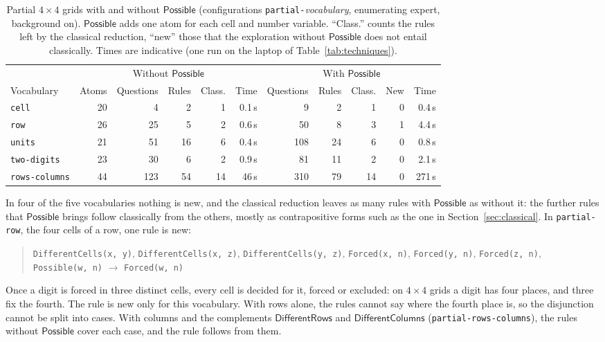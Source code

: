 \documentclass[11pt,a4paper]{article}
\theoremstyle{definition}
\theoremstyle{remark}
\newcommand{\code}[1]{\texttt{#1}}
\newcommand{\pred}[1]{\mathsf{#1}}
\begin{document}
\begin{table}[t]
\centering\small
\setlength{\tabcolsep}{4pt}
\begin{tabular}{@{}lrrrrrrrrrr@{}}
\toprule
& \multicolumn{5}{c}{Without $\pred{Possible}$} & \multicolumn{5}{c}{With $\pred{Possible}$} \\
\cmidrule(lr){2-6}\cmidrule(l){7-11}
Vocabulary & Atoms & Questions & Rules & Class. & Time & Questions & Rules & Class. & New & Time \\
\midrule
\code{cell} & 20 & 4 & 2 & 1 & 0.1\,s & 9 & 2 & 1 & 0 & 0.4\,s \\
\code{row} & 26 & 25 & 5 & 2 & 0.6\,s & 50 & 8 & 3 & 1 & 4.4\,s \\
\code{units} & 21 & 51 & 16 & 6 & 0.4\,s & 108 & 24 & 6 & 0 & 0.8\,s \\
\code{two-digits} & 23 & 30 & 6 & 2 & 0.9\,s & 81 & 11 & 2 & 0 & 2.1\,s \\
\code{rows-columns} & 44 & 123 & 54 & 14 & 46\,s & 310 & 79 & 14 & 0 & 271\,s \\
\bottomrule
\end{tabular}
\caption{Partial $4 \times 4$ grids with and without $\pred{Possible}$ (configurations \code{partial-}\textit{vocabulary}, enumerating expert, background on). $\pred{Possible}$ adds one atom for each cell and number variable. ``Class.'' counts the rules left by the classical reduction, ``new'' those that the exploration without $\pred{Possible}$ does not entail classically. Times are indicative (one run on the laptop of Table~\ref{tab:techniques}).}
\label{tab:possible}
\end{table}

In four of the five vocabularies nothing is new, and the classical reduction leaves as many rules with $\pred{Possible}$ as without it: the further rules that $\pred{Possible}$ brings follow classically from the others, mostly as contrapositive forms such as the one in Section~\ref{sec:classical}. In \code{partial-row}, the four cells of a row, one rule is new:
\begin{quote}\small\raggedright
\texttt{DifferentCells(x,~y)}, \allowbreak \texttt{DifferentCells(x,~z)}, \allowbreak \texttt{DifferentCells(y,~z)}, \allowbreak \texttt{Forced(x,~n)}, \allowbreak \texttt{Forced(y,~n)}, \allowbreak \texttt{Forced(z,~n)}, \allowbreak \texttt{Possible(w,~n)} \;$\to$\; \texttt{Forced(w,~n)}
\end{quote}
Once a digit is forced in three distinct cells, every cell is decided for it, forced or excluded: on $4 \times 4$ grids a digit has four places, and three fix the fourth. The rule is new only for this vocabulary. With rows alone, the rules cannot say where the fourth place is, so the disjunction cannot be split into cases. With columns and the complements $\pred{DifferentRows}$ and $\pred{DifferentColumns}$ (\code{partial-rows-columns}), the rules without $\pred{Possible}$ cover each case, and the rule follows from them.
\end{document}

